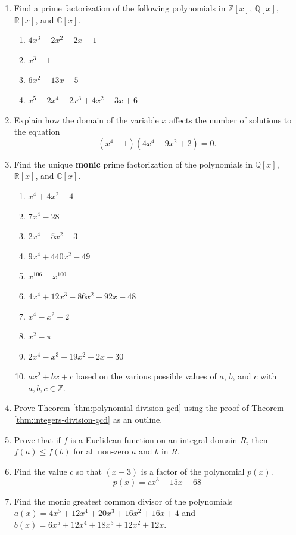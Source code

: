 \documentclass[
]{book}
\providecommand{\tightlist}{%
  \setlength{\itemsep}{0pt}\setlength{\parskip}{0pt}}
\theoremstyle{definition}
\theoremstyle{definition}
\theoremstyle{definition}
\theoremstyle{definition}
\theoremstyle{remark}
\begin{document}
\begin{enumerate}
\def\labelenumi{\arabic{enumi}.}
\item
  Find a prime factorization of the following polynomials in \(\mathbb{Z}[x]\), \(\mathbb{Q}[x]\), \(\mathbb{R}[x]\), and \(\mathbb{C}[x]\).

  \begin{enumerate}
  \def\labelenumii{\alph{enumii}.}
  \tightlist
  \item
    \(4x^3-2x^2+2x-1\)
  \item
    \(x^3-1\)
  \item
    \(6x^2-13x-5\)
  \item
    \(x^5-2x^4-2x^3+4x^2-3x+6\)
  \end{enumerate}
\item
  Explain how the domain of the variable \(x\) affects the number of solutions to the equation \[(x^4-1)(4x^4-9x^2+2)=0.\]
\item
  Find the unique \textbf{monic} prime factorization of the polynomials in \(\mathbb{Q}[x]\), \(\mathbb{R}[x]\), and \(\mathbb{C}[x]\).

  \begin{enumerate}
  \def\labelenumii{\alph{enumii}.}
  \tightlist
  \item
    \(x^4+4x^2+4\)
  \item
    \(7x^4-28\)
  \item
    \(2x^4-5x^2-3\)
  \item
    \(9x^4+440 x^2-49\)
  \item
    \(x^{106} -x^{100}\)
  \item
    \(4x^4+12x^3-86x^2-92x-48\)
  \item
    \(x^4-x^2-2\)
  \item
    \(x^2-\pi\)
  \item
    \(2x^4-x^3-19x^2+2x+30\)
  \item
    \(a x^2 + bx + c\) based on the various possible values of \(a\), \(b\), and \(c\) with \(a,b,c \in \mathbb{Z}\).
  \end{enumerate}
\item
  Prove Theorem \ref{thm:polynomial-division-gcd} using the proof of Theorem \ref{thm:integers-division-gcd} as an outline.
\item
  Prove that if \(f\) is a Euclidean function on an integral domain \(R\), then \(f(a)\leq f(b)\) for all non-zero \(a\) and \(b\) in \(R\).
\item
  Find the value \(c\) so that \((x-3)\) is a factor of the polynomial \(p(x)\). \[p(x)=cx^3-15x-68\]
\item
  Find the monic greatest common divisor of the polynomials \(a(x)=4x^5+12x^4+20x^3+16x^2+16x+4\) and \(b(x)=6x^5+12x^4+18x^3+12x^2+12x\).
\end{enumerate}
\end{document}
